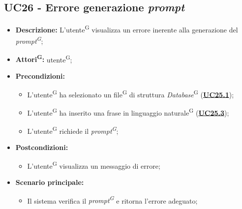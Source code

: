 \subsection{UC26 - Errore generazione \textit{prompt}}
\label{sec:UC26}
\begin{itemize}
	\item \textbf{Descrizione:} L’utente\textsuperscript{G} visualizza un errore inerente alla generazione del \textit{prompt\textsuperscript{G}};
	\item \textbf{Attori\textsuperscript{G}:} utente\textsuperscript{G};
	\item \textbf{Precondizioni:} 
	\begin{itemize}
		\item L’utente\textsuperscript{G} ha selezionato un file\textsuperscript{G} di struttura \textit{Database}\textsuperscript{G} (\hyperref[sec:UC25.1]{\textbf{UC25.1}});
		\item L’utente\textsuperscript{G} ha inserito una frase in linguaggio naturale\textsuperscript{G} (\hyperref[sec:UC25.3]{\textbf{UC25.3}});
		\item L’utente\textsuperscript{G} richiede il \textit{prompt\textsuperscript{G}};
	\end{itemize}
	\item \textbf{Postcondizioni:} 
	\begin{itemize}
		\item L’utente\textsuperscript{G} visualizza un messaggio di errore;
	\end{itemize}
	\item \textbf{Scenario principale:} 
	\begin{itemize}
		\item Il sistema verifica il \textit{prompt\textsuperscript{G}} e ritorna l'errore adeguato;
	\end{itemize}
\end{itemize}


